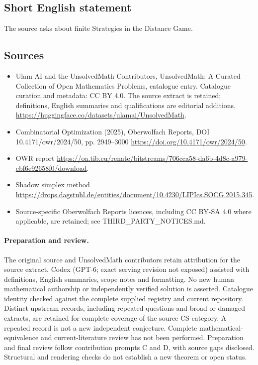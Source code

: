 \documentclass[11pt]{article}
\begin{document}
\subsection{Short English statement}
The source asks about finite Strategies in the Distance Game.
\subsection{Sources}
\begin{itemize}
\item[\hypertarget{source:statement:1}{S1}] Ulam AI and the UnsolvedMath Contributors, UnsolvedMath: A Curated Collection of Open Mathematics Problems, catalogue entry. Catalogue curation and metadata: CC BY 4.0. The source extract is retained; definitions, English summaries and qualifications are editorial additions.
\url{https://huggingface.co/datasets/ulamai/UnsolvedMath}.
\item[\hypertarget{source:statement:2}{S2}] Combinatorial Optimization (2025), Oberwolfach Reports, DOI 10.4171/owr/2024/50, pp. 2949--3000
\url{https://doi.org/10.4171/owr/2024/50}.
\item[\hypertarget{source:statement:3}{S3}] OWR report
\url{https://oa.tib.eu/renate/bitstreams/706cca58-da6b-4d8c-a979-ebf6e92658f0/download}.
\item[\hypertarget{source:statement:4}{S4}] Shadow simplex method
\url{https://drops.dagstuhl.de/entities/document/10.4230/LIPIcs.SOCG.2015.345}.
\item Source-specific Oberwolfach Reports licences, including CC BY-SA 4.0 where applicable, are retained; see THIRD\_PARTY\_NOTICES.md.
\end{itemize}
\paragraph{Preparation and review.}
The original source and UnsolvedMath contributors retain attribution for the source extract. Codex (GPT-6; exact serving revision not exposed) assisted with definitions, English summaries, scope notes and formatting. No new human mathematical authorship or independently verified solution is asserted. Catalogue identity checked against the complete supplied registry and current repository. Distinct upstream records, including repeated questions and broad or damaged extracts, are retained for complete coverage of the source CS category. A repeated record is not a new independent conjecture. Complete mathematical-equivalence and current-literature review has not been performed. Preparation and final review follow contribution prompts C and D, with source gaps disclosed. Structural and rendering checks do not establish a new theorem or open status.
\label{end:statement}
\end{document}
